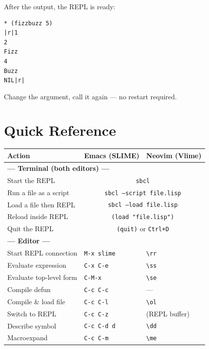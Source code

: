 \documentclass[a4paper,11pt]{article}
\newcommand{\key}[1]{\texttt{#1}}
\begin{document}
After the output, the REPL is ready:

\begin{lstlisting}[style=repl]
* (fizzbuzz 5)
|r|1
2
Fizz
4
Buzz
NIL|r|
\end{lstlisting}

Change the argument, call it again --- no restart required.

\section{Quick Reference}

\begin{center}
\begin{tabular}{lll}
  \toprule
  \textbf{Action} & \textbf{Emacs (SLIME)} & \textbf{Neovim (Vlime)} \\
  \midrule
  \multicolumn{3}{l}{\textbf{--- Terminal (both editors) ---}} \\
  Start the REPL             & \multicolumn{2}{c}{\texttt{sbcl}} \\
  Run a file as a script     & \multicolumn{2}{c}{\texttt{sbcl --script file.lisp}} \\
  Load a file then REPL      & \multicolumn{2}{c}{\texttt{sbcl --load file.lisp}} \\
  Reload inside REPL         & \multicolumn{2}{c}{\texttt{(load "file.lisp")}} \\
  Quit the REPL              & \multicolumn{2}{c}{\texttt{(quit)} or \key{Ctrl+D}} \\
  \midrule
  \multicolumn{3}{l}{\textbf{--- Editor ---}} \\
  Start REPL connection      & \key{M-x slime}  & \key{\textbackslash rr} \\
  Evaluate expression        & \key{C-x C-e}    & \key{\textbackslash ss} \\
  Evaluate top-level form    & \key{C-M-x}      & \key{\textbackslash se} \\
  Compile defun              & \key{C-c C-c}    & --- \\
  Compile \& load file       & \key{C-c C-l}    & \key{\textbackslash ol} \\
  Switch to REPL             & \key{C-c C-z}    & (REPL buffer) \\
  Describe symbol            & \key{C-c C-d d}  & \key{\textbackslash dd} \\
  Macroexpand                & \key{C-c C-m}    & \key{\textbackslash me} \\
  \bottomrule
\end{tabular}
\end{center}
\end{document}
